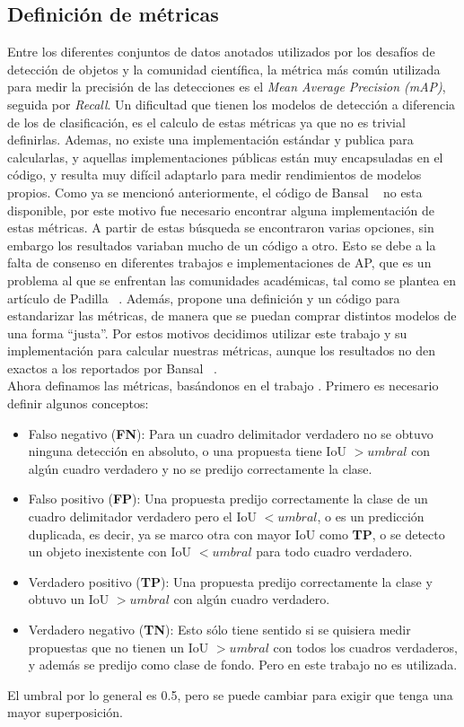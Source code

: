 \subsection{Definición de métricas} \label{ssec:definiciondemetricas}
Entre los diferentes conjuntos de datos anotados utilizados por los desafíos de detección de objetos y la comunidad científica, la métrica más común utilizada para medir la precisión de las detecciones es el  \textit{Mean Average Precision (mAP)}, seguida por \textit{Recall}. Un dificultad que tienen los modelos de detección a diferencia de los de clasificación, es el calculo de estas métricas ya que no es trivial definirlas. Ademas, no existe una implementación estándar y publica para calcularlas, y aquellas implementaciones públicas están muy encapsuladas en el código, y resulta muy difícil adaptarlo para medir rendimientos de modelos propios. Como ya se mencionó anteriormente, el código de Bansal \etal~\cite{bansal2018zero} no esta disponible, por este motivo fue necesario encontrar alguna implementación de estas métricas. A partir de estas búsqueda se encontraron varias opciones, sin embargo los resultados variaban mucho de un código a otro. Esto se debe a la falta de consenso en diferentes trabajos e implementaciones de AP, que es un problema al que se enfrentan las comunidades académicas, tal como se plantea en artículo de Padilla \etal~\cite{padilla2020survey}. Además, \cite{padilla2020survey} propone una definición y un código para estandarizar las métricas, de manera que se puedan comprar distintos modelos de una forma ``justa''. Por estos motivos decidimos utilizar este trabajo y su implementación para calcular nuestras métricas, aunque los resultados no den exactos a los reportados por Bansal \etal~\cite{bansal2018zero}.\\

Ahora definamos las métricas, basándonos en el trabajo \cite{padilla2020survey}. Primero es necesario definir algunos conceptos:
\begin{itemize}
	\item Falso negativo (\textbf{FN}): Para un cuadro delimitador verdadero no se obtuvo ninguna detección en absoluto, o una propuesta tiene IoU $> umbral$ con algún cuadro verdadero y no se predijo correctamente la clase.
	\item Falso positivo (\textbf{FP}): Una propuesta predijo correctamente la clase de un cuadro delimitador verdadero pero el IoU $< umbral$, o es un predicción duplicada, es decir, ya se marco otra con mayor IoU como \textbf{TP}, o se detecto un objeto inexistente con IoU $< umbral$ para todo cuadro verdadero.
	\item Verdadero positivo (\textbf{TP}): Una propuesta predijo correctamente la clase y obtuvo un IoU $> umbral$ con algún cuadro verdadero.
	\item Verdadero negativo (\textbf{TN}): Esto sólo tiene sentido si se quisiera medir propuestas que no tienen un IoU $> umbral$ con todos los cuadros verdaderos, y además se predijo como clase de fondo. Pero en este trabajo no es utilizada.
\end{itemize}
El umbral por lo general es 0.5, pero se puede cambiar para exigir que tenga una mayor superposición.\\


